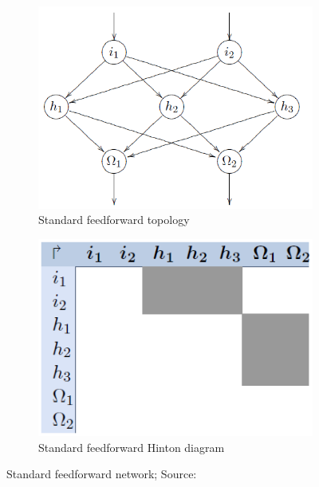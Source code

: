 \documentclass[pdftex,a4paper,12pt,twoside]{report}
\theoremstyle{plain} \newtheorem{theorem}{Theorem} \newtheorem{proposition}{Proposition} \newtheorem{lemma}{Lemma} \newtheorem*{corollary}{Corollary}
\theoremstyle{definition} \newtheorem{definition}{Definition} \newtheorem{conjecture}{Conjecture} \newtheorem*{example}{Example} \newtheorem{algorithm}{Algorithm}
\theoremstyle{remark} \newtheorem*{remark}{Remark} \newtheorem*{note}{Note} \newtheorem{case}{Case}
\begin{document}
\begin{figure}
\centering
	\begin{subfigure}[b]{0.49\textwidth}
	\centering
	\includegraphics[width=\textwidth]{./img/Feedforward-normal-Topology.png}
	\caption{Standard feedforward topology}
	\end{subfigure}
	\begin{subfigure}[b]{0.49\textwidth}
	\centering
	\includegraphics[width=\textwidth]{./img/Feedforward-normal-Hinton.png}
	\caption{Standard feedforward Hinton diagram}
	\end{subfigure}
\caption{Standard feedforward network; Source:\citep{Kriesel2013}}
\label{fig:feedforward}
\end{figure}
\end{document}
